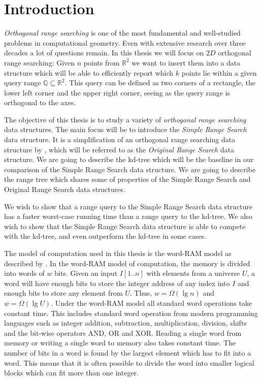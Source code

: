 \chapter{Introduction}
\label{ch:intro}

\noindent \emph{Orthogonal range searching} is one of the most fundamental and well-studied problems in computational geometry. Even with extensive research over three decades a lot of questions remain. In this thesis we will focus on $2D$ orthogonal range searching: Given $n$ points from $\mathbb{R}^2$ we want to insert them into a data structure which will be able to efficiently report which $k$ points lie within a given query range $\mathbb{Q} \subseteq \mathbb{R}^2$. This query can be defined as two corners of a rectangle, the lower left corner and the upper right corner, seeing as the query range is orthogonal to the axes.

The objective of this thesis is to study a variety of \emph{orthogonal range searching} data structures. The main focus will be to introduce the \emph{Simple Range Search} data structure. It is a simplification of an orthogonal range searching data structure by \citet{chanetal}, which will be referred to as the \emph{Original Range Search} data structure. We are going to describe the kd-tree which will be the baseline  in our comparison of the Simple Range Search data structure. We are going to describe the range tree which shares some of properties of the Simple Range Search and Original Range Search data structures.

We wish to show that a range query to the Simple Range Search data structure has a faster worst-case running time than a range query to the kd-tree. We also wish to show that the Simple Range Search data structure is able to compete with the kd-tree, and even outperform the kd-tree in some cases.  

The model of computation used in this thesis is the word-RAM model as described by \citet{wordram}. In the word-RAM model of computation, the memory is divided into words of $w$ bits. Given an input $I[1..n]$ with elements from a universe $U$, a word will have enough bits to store the integer address of any index into $I$ and enough bits to store any element from $U$. Thus, $w = \Omega(\lg n)$ and $w = \Omega(\lg U)$. Under the word-RAM model all standard word operations take constant time. This includes standard word operation from modern programming languages such as integer addition, subtraction, multiplication, division, shifts and the bit-wise operators AND, OR and XOR. Reading a single word from memory or writing a single word to memory also takes constant time. The number of bits in a word is found by the largest element which has to fit into a word. This means that it is often possible to divide the word into smaller logical blocks which can fit more than one integer.  \\


